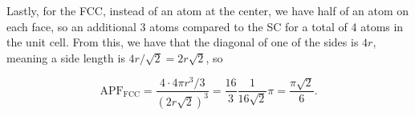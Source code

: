\begin{parts}
  Lastly, for the FCC, instead of an atom at the center, we have half of an atom on each face, so an additional 3 atoms compared to the SC for a total of 4 atoms in the unit cell. From this, we have that the diagonal of one of the sides is $4r$, meaning a side length is $4r/\sqrt{2} = 2r\sqrt{2}$, so

  \begin{equation}
    \mathrm{APF}_{\mathrm{FCC}} = \frac{4 \cdot 4\pi r^3/3}{(2r\sqrt{2})^3} = \frac{16}{3} \frac{1}{16\sqrt{2}}\pi = \frac{\pi\sqrt{2}}{6}.
  \end{equation}
\end{parts}

